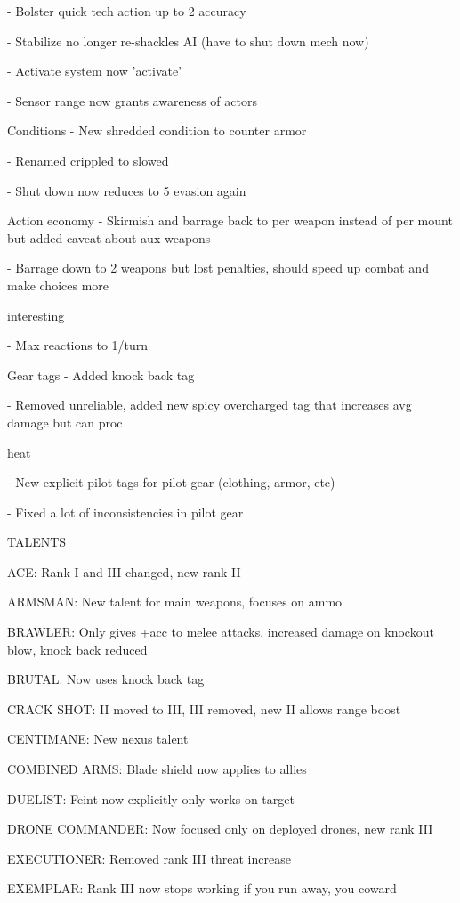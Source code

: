      -   Bolster quick tech action up to 2 accuracy

     -   Stabilize no longer re-shackles AI (have to shut down mech now)

     -   Activate system now 'activate'


     -   Sensor range now grants awareness of actors


Conditions
     -   New shredded condition to counter armor

     -   Renamed crippled to slowed


     -   Shut down now reduces to 5 evasion again


Action economy
     -   Skirmish and barrage back to per weapon instead of per mount but added caveat about aux
         weapons

     -   Barrage down to 2 weapons but lost penalties, should speed up combat and make choices more

         interesting

     -   Max reactions to 1/turn


Gear tags
     -   Added knock back tag

     -   Removed unreliable, added new spicy overcharged tag that increases avg damage but can proc

         heat

     -   New explicit pilot tags for pilot gear (clothing, armor, etc)

     -   Fixed a lot of inconsistencies in pilot gear


TALENTS

ACE: Rank I and III changed, new rank II


ARMSMAN: New talent for main weapons, focuses on ammo

BRAWLER:  Only gives +acc to melee attacks, increased damage on knockout blow, knock back reduced

BRUTAL: Now uses knock back tag


CRACK SHOT:  II moved to III, III removed, new II allows range boost

CENTIMANE: New nexus talent


COMBINED ARMS: Blade shield now applies to allies

DUELIST: Feint now explicitly only works on target

DRONE COMMANDER: Now focused only on deployed drones, new rank III


EXECUTIONER: Removed rank III threat increase

EXEMPLAR: Rank III now stops working if you run away, you coward


